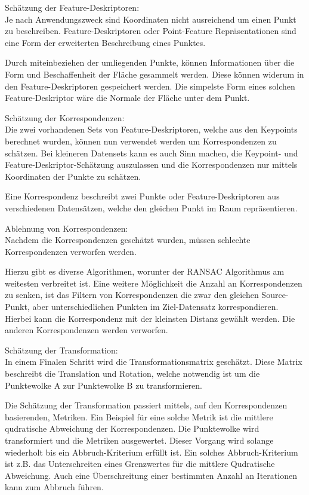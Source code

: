 Schätzung der Feature-Deskriptoren: \\
Je nach Anwendungszweck sind Koordinaten nicht ausreichend um einen Punkt zu beschreiben.
Feature-Deskriptoren oder Point-Feature Repräsentationen sind eine Form der erweiterten Beschreibung eines Punktes.

Durch miteinbeziehen der umliegenden Punkte, können Informationen über die Form und Beschaffenheit der Fläche gesammelt werden.
Diese können widerum in den Feature-Deskriptoren gespeichert werden.
Die simpelste Form eines solchen Feature-Deskriptor wäre die Normale der Fläche unter dem Punkt.
\newline

Schätzung der Korrespondenzen: \\
Die zwei vorhandenen Sets von Feature-Deskriptoren, welche aus den Keypoints berechnet wurden, 
können nun verwendet werden um Korrespondenzen zu schätzen.
Bei kleineren Datensets kann es auch Sinn machen, die Keypoint- und Feature-Deskriptor-Schätzung auszulassen
und die Korrespondenzen nur mittels Koordinaten der Punkte zu schätzen.

Eine Korrespondenz beschreibt zwei Punkte oder Feature-Deskriptoren aus verschiedenen Datensätzen, welche den gleichen Punkt im Raum repräsentieren.
\newline

Ablehnung von Korrespondenzen: \\
Nachdem die Korrespondenzen geschätzt wurden, müssen schlechte Korrespondenzen verworfen werden.

Hierzu gibt es diverse Algorithmen, worunter der RANSAC Algorithmus am weitesten verbreitet ist.
Eine weitere Möglichkeit die Anzahl an Korrespondenzen zu senken, 
ist das Filtern von Korrespondenzen die zwar den gleichen Source-Punkt,
aber unterschiedlichen Punkten im Ziel-Datensatz korrespondieren.
Hierbei kann die Korrespondenz mit der kleinsten Distanz gewählt werden.
Die anderen Korrespondenzen werden verworfen.
\newline

Schätzung der Transformation: \\
In einem Finalen Schritt wird die Transformationsmatrix geschätzt.
Diese Matrix beschreibt die Translation und Rotation, 
welche notwendig ist um die Punktewolke A zur Punktewolke B zu transformieren.

Die Schätzung der Transformation passiert mittels, auf den Korrespondenzen basierenden, Metriken.
Ein Beispiel für eine solche Metrik ist die mittlere qudratische Abweichung der Korrespondenzen.
Die Punktewolke wird transformiert und die Metriken ausgewertet.
Dieser Vorgang wird solange wiederholt bis ein Abbruch-Kriterium erfüllt ist.
Ein solches Abbruch-Kriterium ist z.B. das Unterschreiten eines Grenzwertes für die mittlere Qudratische Abweichung.
Auch eine Überschreitung einer bestimmten Anzahl an Iterationen kann zum Abbruch führen.

